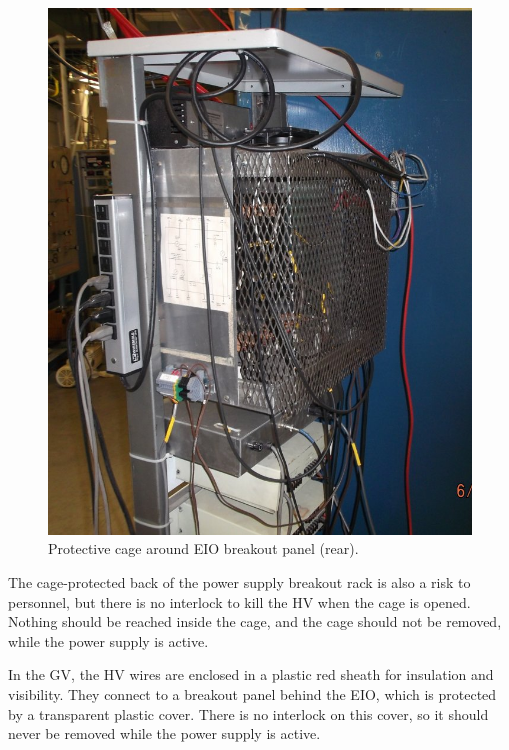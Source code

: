 \begin{figure}[htbp!]
\begin{minipage}{0.45\textwidth}
   \includegraphics[width=\textwidth]{./img/hv-safety-cage.jpg}
   \caption{Protective cage around EIO breakout panel (rear).}
 \label{fig:hv-safety-cage}
  \end{minipage}
\end{figure}


The cage-protected back of the power supply breakout rack is also a risk to personnel, but there is no interlock to kill the HV when the cage is opened.  Nothing should be reached inside the cage, and the cage should not be removed, while the power supply is active.

In the GV, the HV wires are enclosed in a plastic red sheath for insulation and visibility.  They connect to a breakout panel behind the EIO, which is protected by a transparent plastic cover.  There is no interlock on this cover, so it should never be removed while the power supply is active.


